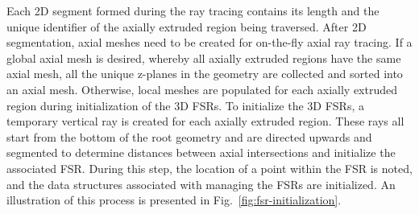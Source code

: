 Each 2D segment formed during the ray tracing contains its length and the unique identifier of the axially extruded region being traversed. After 2D segmentation, axial meshes need to be created for on-the-fly axial ray tracing. If a global axial mesh is desired, whereby all axially extruded regions have the same axial mesh, all the unique z-planes in the geometry are collected and sorted into an axial mesh. Otherwise, local meshes are populated for each axially extruded region during initialization of the 3D FSRs. To initialize the 3D FSRs, a temporary vertical ray is created for each axially extruded region. These rays all start from the bottom of the root geometry and are directed upwards and segmented to determine distances between axial intersections and initialize the associated FSR. During this step, the location of a point within the FSR is noted, and the data structures associated with managing the FSRs are initialized. An illustration of this process is presented in Fig.~\ref{fig:fsr-initialization}.


